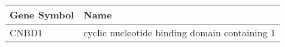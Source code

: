 \begin{tabular}{ll}
\toprule
Gene Symbol &                                          Name \\
\midrule
      CNBD1 & cyclic nucleotide binding domain containing 1 \\
\bottomrule
\end{tabular}
